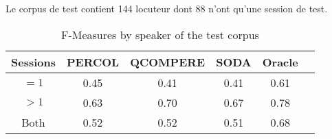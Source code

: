 
Le corpus de test contient 144 locuteur dont 88 n'ont qu'une session de test.


\begin{table}
\begin{tabular}{|c|ccc|c|c|}
 \hline
Sessions & PERCOL  & QCOMPERE & SODA & Oracle \\
 \hline
$=1$& 0.45 & 0.41 & 0.41 & 0.61 \\
$>1$ & 0.63 & 0.70 & 0.67 & 0.78 \\
 \hline
Both & 0.52 & 0.52 & 0.51 & 0.68\\
 \hline
\end{tabular}
\caption{F-Measures by speaker of the test corpus}
\end{table}